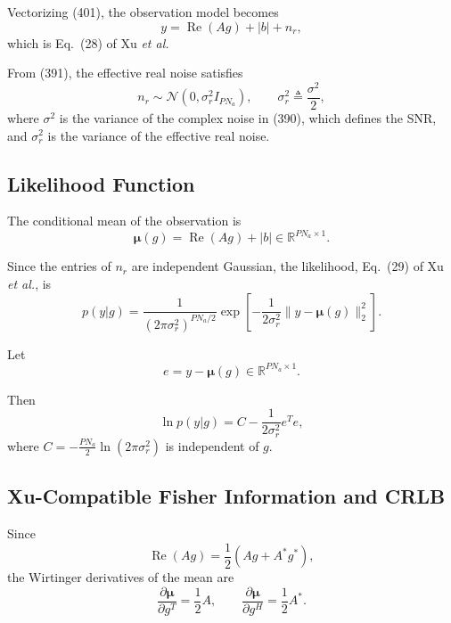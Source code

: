 \documentclass[12pt,a4paper]{article}
\begin{document}
Vectorizing (401), the observation model becomes
\begin{equation}
\boxed{
 y
 =
\operatorname{Re}(Ag)+|b|+n_r,
}
\tag{437}
\end{equation}
which is Eq.~(28) of Xu \emph{et al.}

From (391), the effective real noise satisfies
\begin{equation}
\boxed{
 n_r\sim\mathcal N(0,\sigma_r^2 I_{PN_a}),
 \qquad
 \sigma_r^2\triangleq\frac{\sigma^2}{2},
}
\tag{438}
\end{equation}
where $\sigma^2$ is the variance of the complex noise in (390), which
defines the SNR, and $\sigma_r^2$ is the variance of the effective real
noise.

\subsection{Likelihood Function}

The conditional mean of the observation is
\begin{equation}
\boxed{
\boldsymbol\mu(g)
=
\operatorname{Re}(Ag)+|b|
\in\mathbb R^{PN_a\times1}.
}
\tag{439}
\end{equation}

Since the entries of $n_r$ are independent Gaussian, the likelihood,
Eq.~(29) of Xu \emph{et al.}, is
\begin{equation}
\boxed{
 p(y|g)
 =
 \frac{1}
 {(2\pi\sigma_r^2)^{PN_a/2}}
 \exp\!\left[
 -\frac{1}{2\sigma_r^2}
 \|y-\boldsymbol\mu(g)\|_2^2
 \right].
}
\tag{440}
\end{equation}

Let
\begin{equation}
 e=y-\boldsymbol\mu(g)\in\mathbb R^{PN_a\times1}.
\tag{441}
\end{equation}

Then
\begin{equation}
\boxed{
\ln p(y|g)
=C-
\frac{1}{2\sigma_r^2}e^Te,
}
\tag{442}
\end{equation}
where $C=-\frac{PN_a}{2}\ln(2\pi\sigma_r^2)$ is independent of $g$.

\subsection{Xu-Compatible Fisher Information and CRLB}

Since
\begin{equation}
\operatorname{Re}(Ag)
=
\frac12(Ag+A^*g^*),
\tag{443}
\end{equation}
the Wirtinger derivatives of the mean are
\begin{equation}
\boxed{
\frac{\partial\boldsymbol\mu}{\partial g^T}
=\frac12A,
\qquad
\frac{\partial\boldsymbol\mu}{\partial g^H}
=\frac12A^*.
}
\tag{444}
\end{equation}
\end{document}
